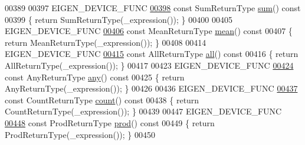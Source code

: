 \begin{DoxyCode}
00389 
00397     EIGEN\_DEVICE\_FUNC
\hyperlink{group___core___module_a2005154bdb90789c0eb55343be9694c1}{00398}     \textcolor{keyword}{const} SumReturnType \hyperlink{group___core___module_a2005154bdb90789c0eb55343be9694c1}{sum}()\textcolor{keyword}{ const}
00399 \textcolor{keyword}{    }\{ \textcolor{keywordflow}{return} SumReturnType(\_expression()); \}
00400 
00405     EIGEN\_DEVICE\_FUNC
\hyperlink{group___core___module_aea15d46c791ef6d17860fc8a61a5fbd6}{00406}     \textcolor{keyword}{const} MeanReturnType \hyperlink{group___core___module_aea15d46c791ef6d17860fc8a61a5fbd6}{mean}()\textcolor{keyword}{ const}
00407 \textcolor{keyword}{    }\{ \textcolor{keywordflow}{return} MeanReturnType(\_expression()); \}
00408 
00414     EIGEN\_DEVICE\_FUNC
\hyperlink{group___core___module_a2762ceabf1fecc22506ed304d0099f6c}{00415}     \textcolor{keyword}{const} AllReturnType \hyperlink{group___core___module_a2762ceabf1fecc22506ed304d0099f6c}{all}()\textcolor{keyword}{ const}
00416 \textcolor{keyword}{    }\{ \textcolor{keywordflow}{return} AllReturnType(\_expression()); \}
00417 
00423     EIGEN\_DEVICE\_FUNC
\hyperlink{group___core___module_a7a513e04b7198f2fc565f636309337cc}{00424}     \textcolor{keyword}{const} AnyReturnType \hyperlink{group___core___module_a7a513e04b7198f2fc565f636309337cc}{any}()\textcolor{keyword}{ const}
00425 \textcolor{keyword}{    }\{ \textcolor{keywordflow}{return} AnyReturnType(\_expression()); \}
00426 
00436     EIGEN\_DEVICE\_FUNC
\hyperlink{group___core___module_abf7ae4a00d195d06d46ad6c269d8508f}{00437}     \textcolor{keyword}{const} CountReturnType \hyperlink{group___core___module_abf7ae4a00d195d06d46ad6c269d8508f}{count}()\textcolor{keyword}{ const}
00438 \textcolor{keyword}{    }\{ \textcolor{keywordflow}{return} CountReturnType(\_expression()); \}
00439 
00447     EIGEN\_DEVICE\_FUNC
\hyperlink{group___core___module_a6863499c3e7ea8635784376806abcf9f}{00448}     \textcolor{keyword}{const} ProdReturnType \hyperlink{group___core___module_a6863499c3e7ea8635784376806abcf9f}{prod}()\textcolor{keyword}{ const}
00449 \textcolor{keyword}{    }\{ \textcolor{keywordflow}{return} ProdReturnType(\_expression()); \}
00450 

\end{DoxyCode}
